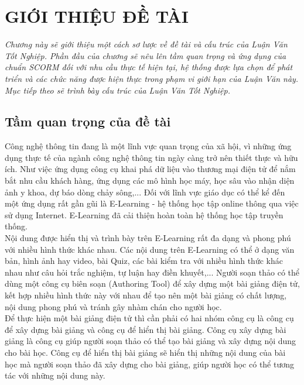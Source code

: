 \chapter{GIỚI THIỆU ĐỀ TÀI}

	\fontsize{12pt}{7pt}\selectfont
	\noindent\textit{Chương này sẽ giới thiệu một cách sơ lược về đề tài và cấu trúc của Luận Văn Tốt Nghiệp. Phần đầu của chương sẽ nêu lên tầm quan trọng và ứng dụng của chuẩn SCORM đối với nhu cầu thực tế hiện tại, hệ thống được lựa chọn để phát triển và các chức năng được hiện thực trong phạm vi giới hạn của Luận Văn này. Mục tiếp theo sẽ trình bày cấu trúc của Luận Văn Tốt Nghiệp.}

\section{Tầm quan trọng của đề tài}

	Công nghệ thông tin đang là một lĩnh vực quan trọng của xã hội, vì những ứng dụng thực tế của ngành công nghệ thông tin ngày càng trở nên thiết thực và hữu ích.  Như việc ứng dụng công cụ khai phá dữ liệu vào thương mại điện tử để nắm bắt nhu cầu khách hàng, ứng dụng các mô hình học máy, học sâu vào nhận diện ảnh y khoa, dự báo dòng chảy sông,... Đối với lĩnh vực giáo dục có thể kể đến một ứng dụng rất gần gũi là E-Learning - hệ thống học tập online thông qua việc sử dụng Internet. E-Learning đã cải thiện hoàn toàn hệ thống học tập truyền thống.\\

	Nội dung được hiển thị và trình bày trên E-Learning rất đa dạng và phong phú với nhiều hình thức khác nhau. Các nội dung trên E-Learning có thể ở dạng văn bản, hình ảnh hay video, bài Quiz, các bài kiểm tra với nhiều hình thức khác nhau như câu hỏi trắc nghiệm, tự luận hay điền khuyết,... Người soạn thảo có thể dùng một công cụ biên soạn (Authoring Tool) để xây dựng một bài giảng điện tử, kết hợp nhiều hình thức này với nhau để tạo nên một bài giảng có chất lượng, nội dung phong phú và tránh gây nhàm chán cho người học.\\
	
	Để thực hiện một bài giảng điện tử thì cần phải có hai nhóm công cụ là công cụ để xây dựng bài giảng và công cụ để hiển thị bài giảng. Công cụ xây dựng bài giảng là công cụ giúp người soạn thảo có thể tạo bài giảng và xây dựng nội dung cho bài học. Công cụ để hiển thị bài giảng sẽ hiển thị những nội dung của bài học mà người soạn thảo đã xây dựng cho bài giảng, giúp người học có thể tương tác với những nội dung này.
	
